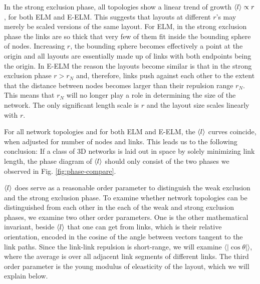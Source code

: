 \documentclass[nofootinbib,preprint,floatfix]{revtex4} %
\begin{document}
In the strong exclusion phase, all topologies show a linear trend of growth $\left<l\right> \propto r$, for both ELM and E-ELM.
This suggests that layouts at different $r$'s may merely be scaled versions of the same layout.
For ELM, %
in the strong exclusion phase the links are so thick that very few of them fit inside the bounding sphere of nodes. 
Increasing $r$, the bounding sphere becomes effectively a point at the origin and all layouts are essentially made up of links with both endpoints being the origin. 
In E-ELM the reason the layouts become similar is that in the strong exclusion phase $r > r_N$ and, therefore, links push against each other to the extent that the distance between nodes becomes larger than their repulsion range $r_N$. This means that $r_N$ will no longer play a role in determining the size of the network. The only significant length scale is $r$ and the layout size scales linearly with $r$. 

For all network topologies and for both ELM and E-ELM, the $\left<l\right>$ curves coincide, 
when adjusted for number of nodes and links. This leads us to the following conclusion: 
If a class of 3D networks is laid out in space by solely minimizing link length, the phase diagram of $\left<l\right>$ should only consist of the two phases we observed in Fig. \ref{fig:phase-compare}. 

$\left<l\right>$ does serve as a reasonable order parameter to distinguish the weak exclusion and the strong exclusion phase. 
To examine whether network topologies can be distinguished from each other in the each of the weak and strong exclusion phases, we examine two other order parameters. 
One is the other mathematical invariant, beside $\left<l\right>$  that one can get from links, %
which is their relative orientation, encoded in the cosine of the angle between vectors tangent to the link paths. 
Since the link-link repulsion is short-range, 
we will examine $\langle |\cos\theta |\rangle$, where the average is over all adjacent link segments of different links. The third order parameter is the young modulus of eleasticity of the layout, which we will explain below. 
\end{document}
